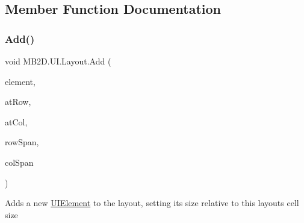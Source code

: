 \subsection{Member Function Documentation}
\hypertarget{class_m_b2_d_1_1_u_i_1_1_layout_aef7a54a9b1c195a99cdd83d1d526ddd4}{}\label{class_m_b2_d_1_1_u_i_1_1_layout_aef7a54a9b1c195a99cdd83d1d526ddd4} 
\subsubsection{\texorpdfstring{Add()}{Add()}}
{\footnotesize\ttfamily void M\+B2\+D.\+U\+I.\+Layout.\+Add (\begin{DoxyParamCaption}\item[{\hyperlink{class_m_b2_d_1_1_u_i_1_1_u_i_element}{U\+I\+Element}}]{element,  }\item[{int}]{at\+Row,  }\item[{int}]{at\+Col,  }\item[{int}]{row\+Span,  }\item[{int}]{col\+Span }\end{DoxyParamCaption})\hspace{0.3cm}{\ttfamily [inline]}}



Adds a new \hyperlink{class_m_b2_d_1_1_u_i_1_1_u_i_element}{U\+I\+Element} to the layout, setting its size relative to this layouts cell size 


